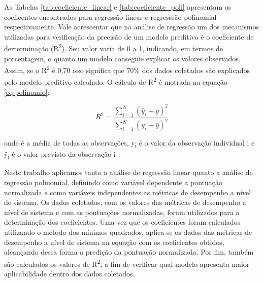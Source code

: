 As Tabelas \ref{tab:coeficiente_linear} e \ref{tab:coeficiente_poli} apresentam
os coeficentes encontrados para regressão linear e regresssão polinomial
respectivamente. Vale acrescentar que na análise de regressão um dos mecanismos
utilizadas para verificação da precisão de um modelo preditivo é o coeficiente
de derterminação (R\textsuperscript{2}). Seu valor varia de 0 a 1, indicando,
em termos de porcentagem, o quanto um modelo conseguie explicar os valores
observados. Assim, se o R\textsuperscript{2} é 0,70 isso significa que 70\% dos
dados coletados são explicados pelo modelo preditivo calculado. O cálculo de
R\textsuperscript{2} é motrada na equação \ref{eq:polinomio}:

\begin{equation}
\label{eq:polinomio}  
R^2 = \frac{ \sum\limits_{i=1}^{N}(\hat{y}_i - \overline{y})^2}{\sum\limits_{i=1}^{N}(y_i - \overline{y})^2}
\end{equation} 

onde  é a média de todas as observações, y\textsubscript{i} é o
valor da observação individual i e \^{y}\textsubscript{i} é o valor previsto da
observação i \cite{hair}.

Neste trabalho aplicamos tanto a análise de regressão linear quanto a análise
de regressão polinomial, definindo como variável dependente a pontuação
normalizada e como variáveis independentes as métricas de desempenho a nível de
sistema. Os dados coletados, com os valores das métricas de desempenho a nível
de sistema e com as pontuações normalizadas, foram utilizados para a
determinação dos coeficientes. Uma vez que os coeficientes foram calculados
utilizando o método dos mínimos quadrados, aplica-se os dados das métricas de
desempenho a nível de sistema na equação com os coeficientes obtidos,
alcançando dessa forma a predição da pontuação normalizada. Por fim, também são
calculados os valores de R\textsuperscript{2}, a fim de verificar qual modelo
apresenta maior aplicabilidade dentro dos dados coletados.

